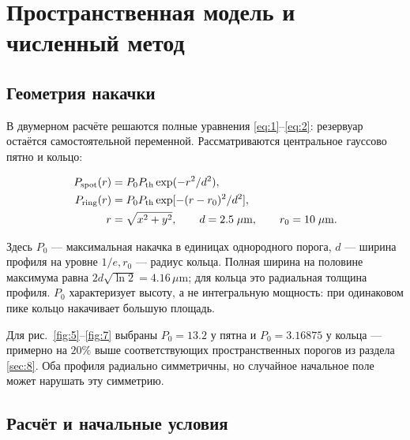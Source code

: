 \documentclass[12pt,a4paper]{article}
\begin{document}
\clearpage

\section{Пространственная модель и численный метод}\label{sec:5}

\subsection{Геометрия накачки}\label{sec:5.1}

В двумерном расчёте решаются полные уравнения \eqref{eq:1}--\eqref{eq:2}: резервуар остаётся самостоятельной переменной. Рассматриваются центральное гауссово пятно и кольцо:

\begin{equation}\label{eq:24}
\begin{aligned}
P_{\rm spot}(r)&=P_0P_{\rm th}\exp(-r^2/d^2),\\
P_{\rm ring}(r)&=P_0P_{\rm th}\exp[-(r-r_0)^2/d^2],\\
r&=\sqrt{x^2+y^2},\qquad d=2.5\;\mu\mathrm m,\qquad r_0=10\;\mu\mathrm m.
\end{aligned}\end{equation}

Здесь $P_{0}$ --- максимальная накачка в единицах однородного порога, $d$ --- ширина профиля на уровне $1/e, r_{0}$ --- радиус кольца. Полная ширина на половине максимума равна $2d \sqrt{\ln 2}=4.16\,\mu\mathrm m$; для кольца это радиальная толщина профиля. $P_{0}$ характеризует высоту, а не интегральную мощность: при одинаковом пике кольцо накачивает большую площадь.

Для рис.~\ref{fig:5}--\ref{fig:7} выбраны $P_{0}=13.2$ у пятна и $P_{0}=3.16875$ у кольца --- примерно на $20\%$ выше соответствующих пространственных порогов из раздела \ref{sec:8}. Оба профиля радиально симметричны, но случайное начальное поле может нарушать эту симметрию.

\subsection{Расчёт и начальные условия}\label{sec:5.2}
\end{document}
